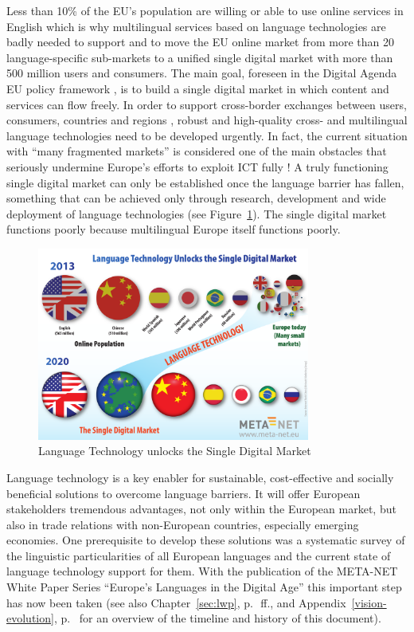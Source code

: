 \documentclass[10pt, plain]{../../metanetpaper}
\begin{document}
\begin{multicols}{2}
Less than 10\% of the EU's population are willing or able to use online services in English which is why multilingual services based on language technologies are badly needed to support and to move the EU online market from more than 20 language-specific sub-markets to a unified single digital market with more than 500 million users and consumers. The main goal, foreseen in the Digital Agenda EU policy framework \cite{DA2010}, is to build a single digital market in which content and services can flow freely. In order to support cross-border exchanges between users, consumers, countries and regions \cite{economist12}, robust and high-quality cross- and multilingual language technologies need to be developed urgently. In fact, the current situation with ``many fragmented markets'' is considered one of the main obstacles that seriously undermine Europe's efforts to exploit ICT fully \cite{DA2010}! A truly functioning single digital market can only be established once the language barrier has fallen, something that can be achieved only through research, development and wide deployment of language technologies (see Figure~\ref{fig:single-digital-market}). The single digital market functions poorly because multilingual Europe itself functions poorly.

\begin{figure}[htb]
  \center
  \includegraphics[width=0.8\textwidth]{../_media/single-digital-market}
  \caption{Language Technology unlocks the Single Digital Market}
  \label{fig:single-digital-market}
\end{figure}

Language technology is a key enabler for sustainable, cost-effective and socially beneficial solutions to overcome language barriers. It will offer European stakeholders tremendous advantages, not only within the European market, but also in trade relations with non-European countries, especially emerging economies. One prerequisite to develop these solutions was a systematic survey of the linguistic particularities of all European languages and the current state of language technology support for them. With the publication of the META-NET White Paper Series ``Europe's Languages in the Digital Age'' \cite{LWP2012} this important step has now been taken (see also Chapter~\ref{sec:lwp}, p.~\pageref{sec:lwp}\,ff., and Appendix~\ref{vision-evolution}, p.~\pageref{vision-evolution} for an overview of the timeline and history of this document).


\end{multicols}
\end{document}
